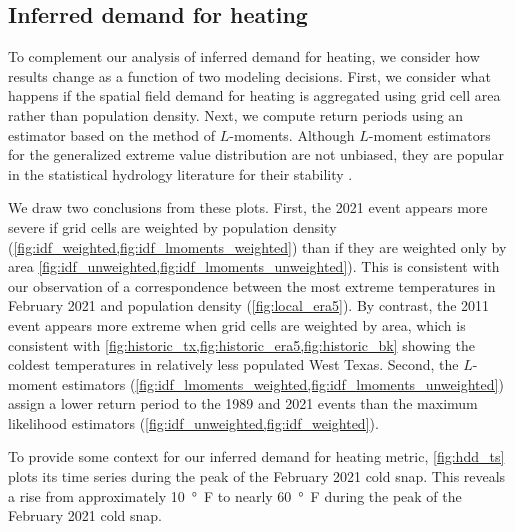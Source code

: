 \documentclass[12pt]{iopart}
\begin{document}
\subsection{Inferred demand for heating}

To complement our analysis of inferred demand for heating, we consider how results change as a function of two modeling decisions.
First, we consider what happens if the spatial field demand for heating is aggregated using grid cell area rather than population density.
Next, we compute return periods using an estimator based on the method of $L$-moments.
Although $L$-moment estimators for the generalized extreme value distribution are not unbiased, they are popular in the statistical hydrology literature for their stability \cite{hosking_gev:1985,martins_gev:2001,morrison_gev:2002}.

We draw two conclusions from these plots.
First, the 2021 event appears more severe if grid cells are weighted by population density (\cref{fig:idf_weighted,fig:idf_lmoments_weighted}) than if they are weighted only by area \cref{fig:idf_unweighted,fig:idf_lmoments_unweighted}).
This is consistent with our observation of a correspondence between the most extreme temperatures in February 2021 and population density (\cref{fig:local_era5}).
By contrast, the 2011 event appears more extreme when grid cells are weighted by area, which is consistent with \cref{fig:historic_tx,fig:historic_era5,fig:historic_bk} showing the coldest temperatures in relatively less populated West Texas.
Second, the $L$-moment estimators (\cref{fig:idf_lmoments_weighted,fig:idf_lmoments_unweighted}) assign a lower return period to the 1989 and 2021 events than the maximum likelihood estimators (\cref{fig:idf_unweighted,fig:idf_weighted}).

To provide some context for our inferred demand for heating metric, \cref{fig:hdd_ts} plots its time series during the peak of the February 2021 cold snap.
This reveals a rise from approximately \SI{10}{\degree F} to nearly \SI{60}{\degree F} during the peak of the February 2021 cold snap.
\end{document}
